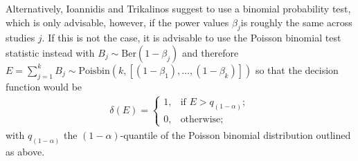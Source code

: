 Alternatively, Ioannidis and Trikalinos suggest to use a binomial probability test,  which is only advisable, however, if the power values $\beta_j$is roughly the same across studies $j$. If this is not the case, it is advisable to use the Poisson binomial test statistic instead with ${B_j \sim \text{Ber}( 1-\beta_j)}$ and therefore ${E  = \sum_{j=1}^k B_j \sim \text{Poisbin}(k, [(1-\beta_1),\dots,(1-\beta_k)])}$ so that the decision function would be 
\begin{align*}
    \delta(E) = \begin{cases} 1, & \text{if } E > q_{(1-\alpha)}; \\ 0, & \mbox{otherwise;}\end{cases}
\end{align*}
with $q_{(1-\alpha)}$ the $(1-\alpha)$-quantile of the Poisson binomial distribution outlined as above.\par


